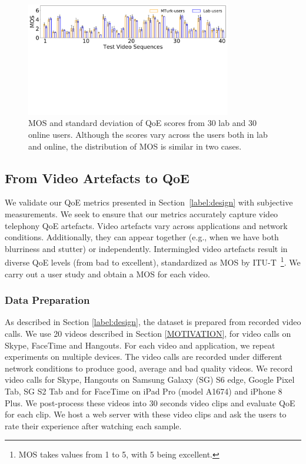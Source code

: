 \begin{figure}[t]
  \centering
  \includegraphics[width=0.8\textwidth]{sections/network-work/mos}
  \vspace{-1.8in}
  \caption{MOS and standard deviation of QoE scores from 30 lab and 30 online users. Although the scores vary across the users both in lab and online, the distribution of MOS is similar in two cases.}
  \vspace{-0.12in}
  \label{fig:mos}
\end{figure}

\subsection{From Video Artefacts to Q\lowercase{o}E} \label{label:results}
We validate our QoE metrics presented in Section~\ref{label:design} with subjective measurements. We seek to ensure that our metrics accurately capture  video telephony QoE artefacts. Video artefacts vary across applications and network conditions. Additionally, they can appear together (e.g., when we have both blurriness and stutter) or independently. Intermingled video artefacts result in diverse QoE levels (from bad to excellent), standardized as MOS by ITU-T~\cite{series2012methodology}\footnote{MOS takes values from 1 to 5, with 5 being excellent.}. We carry out a user study and obtain a MOS for each video.

\subsubsection{Data Preparation}
As described in Section \ref{label:design}, the dataset is prepared from recorded video calls. We use 20 videos described in Section \ref{MOTIVATION}, for video calls on Skype, FaceTime and Hangouts. For each video and application, we repeat  experiments on  multiple devices. The video calls are recorded under different network conditions to produce good, average and bad quality videos. We record video calls for Skype, Hangouts on Samsung Galaxy (SG) S6 edge, Google Pixel Tab, SG S2 Tab and for FaceTime on iPad Pro (model A1674) and iPhone 8 Plus. We post-process these videos into 30 seconds  video clips and evaluate QoE for each clip. We host a web server with these video clips and ask the users to rate their experience after watching each sample. 

